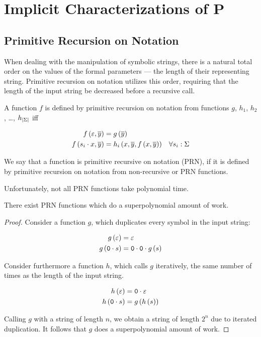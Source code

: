
\chapter{Implicit Characterizations of P}

\section{Primitive Recursion on Notation}

When dealing with the manipulation of symbolic strings, there is a natural
total order on the values of the formal parameters --- the length of their
representing string. Primitive recursion on notation utilizes this order,
requiring that the length of the input string be decreased before a recursive
call.

\begin{definition} A function $f$ is defined by primitive recursion on notation
from functions $g$, $h_1$, $h_2$, \ldots, $h_{\left|{\Sigma}\right|}$ iff 

\begin{align}
f\left({\varepsilon, \overline{y}}\right)  &= g\left({\overline{y}}\right) \\
f\left({s_i \cdot x,\overline{y}}\right) &= h_i\left({x,\overline{y},f\left({x,\overline{y}}\right)}\right) & \forall s_i: \Sigma
\end{align}

\end{definition}

We say that a function is primitive recursive on notation (PRN), if it is defined by
primitive recursion on notation from non-recursive or PRN functions.

Unfortunately, not all PRN functions take polynomial time.

\begin{theorem} There exist PRN functions which do a superpolynomial amount of
work.\end{theorem} 

\begin{proof}
Consider a function $g$, which duplicates every symbol in the input string:

\begin{align}
g\left({\varepsilon}\right) &= \varepsilon \\
g\left({\mathtt{0} \cdot s}\right) &= \mathtt{0} \cdot \mathtt{0} \cdot g\left({s}\right)
\end{align}

Consider furthermore a function $h$, which calls $g$ iteratively, the same
number of times as the length of the input string.

\begin{align}
h\left({\varepsilon}\right) &= \mathtt{0} \cdot \varepsilon \\
h\left({\mathtt{0} \cdot s}\right) &= g\left({h\left({s}\right)}\right)
\end{align}

Calling $g$ with a string of length $n$, we obtain a string of length $2^n$ due
to iterated duplication. It follows that $g$ does a superpolynomial amount of
work. \end{proof}

